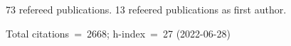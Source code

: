 73 refereed publications. 13 refeered publications as first author.

Total citations~=~2668; h-index~=~27 (2022-06-28)